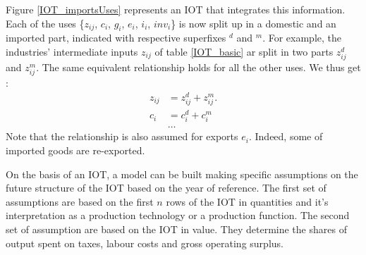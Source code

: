 \documentclass[12pt,english]{article}
\begin{document}
Figure \ref{IOT_importsUses} represents an IOT that integrates this information. Each of the uses \{$z_{ij}$, $c_i$, $g_i$, $e_i$, $i_i$,  $inv_i$\} is now split up in a domestic and an imported part, indicated with respective superfixes $^d$ and $^m$. For example, the industries' intermediate inputs $z_{ij}$ of table \ref{IOT_basic} ar split in two parts $z_{ij}^d$ and $z_{ij}^m$. The same equivalent relationship holds for all the other uses. We thus get : 
\begin{align}
z_{ij} &= z_{ij}^d + z_{ij}^m. \label{usesDecompMX} \\
c_i &= c_i^d + c_i^m \nonumber \\
&\ldots \nonumber
\end{align}  Note that the relationship is also assumed for exports $e_i$. Indeed, some of imported goods are re-exported. 	

On the basis of an IOT, a model can be built making specific assumptions on the future structure of the IOT based on the year of reference. The first set of assumptions are based on the first $n$ rows of the IOT in quantities and it's interpretation as a %
production technology or a production function. %
The second set of assumption are based on the IOT in value. They determine the shares of output spent on taxes, labour costs and gross operating surplus.
\end{document}
